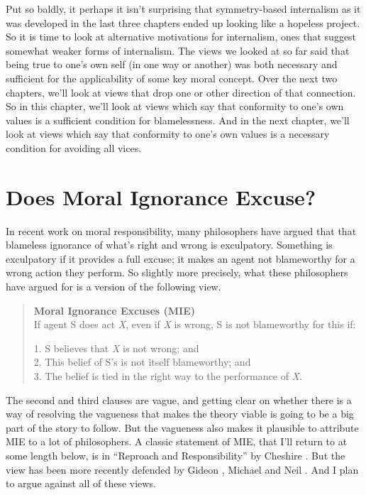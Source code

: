 Put so baldly, it perhaps it isn't surprising that symmetry-based internalism as it was developed in the last three chapters ended up looking like a hopeless project. So it is time to look at alternative motivations for internalism, ones that suggest somewhat weaker forms of internalism. The views we looked at so far said that being true to one's own self (in one way or another) was both necessary and sufficient for the applicability of some key moral concept. Over the next two chapters, we'll look at views that drop one or other direction of that connection. So in this chapter, we'll look at views which say that conformity to one's own values is a sufficient condition for blamelessness. And in the next chapter, we'll look at views which say that conformity to one's own values is a necessary condition for avoiding all vices.

\section{Does Moral Ignorance Excuse?}
\label{doesmoralignoranceexcuse}

In recent work on moral responsibility, many philosophers have argued that that blameless ignorance of what's right and wrong is exculpatory. Something is exculpatory if it provides a full excuse; it makes an agent not blameworthy for a wrong action they perform. So slightly more precisely, what these philosophers have argued for is a version of the following view.

\begin{quote}
\textbf{Moral Ignorance Excuses (MIE)}\\
If agent S does act \emph{X}, even if \emph{X} is wrong, S is not blameworthy for this if:

 1. S believes that \emph{X} is not wrong; and\\
 2. This belief of S's is not itself blameworthy; and\\
 3. The belief is tied in the right way to the performance of \emph{X}.
\end{quote}
The second and third clauses are vague, and getting clear on whether there is a way of resolving the vagueness that makes the theory viable is going to be a big part of the story to follow. But the vagueness also makes it plausible to attribute MIE to a lot of philosophers. A classic statement of MIE, that I'll return to at some length below, is in ``Reproach and Responsibility'' by Cheshire \citet{Calhoun1989}. But the view has been more recently defended by Gideon \citet{Rosen2003, Rosen2004}, Michael \citet{Zimmerman2008} and Neil \citet{Levy2009}. And I plan to argue against all of these views.

